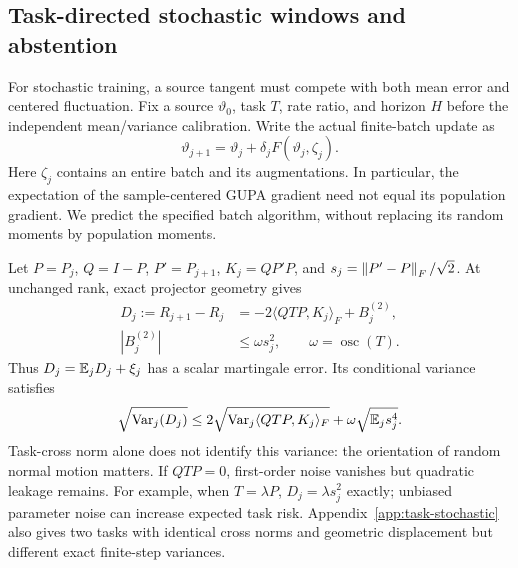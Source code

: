 \subsection{Task-directed stochastic windows and abstention}
\label{sec:task-stochastic}
For stochastic training, a source tangent must compete with both mean error and centered fluctuation. Fix a source $\vartheta_0$, task $T$, rate ratio, and horizon $H$ before the independent mean/variance calibration. Write the actual finite-batch update as
\begin{equation}
 \vartheta_{j+1}=\vartheta_j+\delta_jF(\vartheta_j,\zeta_j).
 \label{eq:stoch-update}
\end{equation}
Here $\zeta_j$ contains an entire batch and its augmentations. In particular, the expectation of the sample-centered GUPA gradient need not equal its population gradient. We predict the specified batch algorithm, without replacing its random moments by population moments.

Let $P=P_j$, $Q=I-P$, $P'=P_{j+1}$, $K_j=QP'P$, and $s_j=\left\lVert P'-P\right\rVert_F/\sqrt2$. At unchanged rank, exact projector geometry gives
\begin{align}
 D_j:=R_{j+1}-R_j&=-2\langle QTP,K_j\rangle_F+B_j^{(2)},\\
 |B_j^{(2)}|&\le\omega s_j^2,\qquad \omega=\operatorname{osc}(T).
 \label{eq:stoch-cross-leakage}
\end{align}
Thus $D_j=\mathbb E_jD_j+\xi_j$ has a scalar martingale error. Its conditional variance satisfies
\begin{equation}
 \sqrt{\operatorname{Var}_j(D_j)}
 \le2\sqrt{\operatorname{Var}_j\langle QTP,K_j\rangle_F}
       +\omega\sqrt{\mathbb E_js_j^4}.
 \label{eq:stoch-task-variance}
\end{equation}
Task-cross norm alone does not identify this variance: the orientation of random normal motion matters. If $QTP=0$, first-order noise vanishes but quadratic leakage remains. For example, when $T=\lambda P$, $D_j=\lambda s_j^2$ exactly; unbiased parameter noise can increase expected task risk. Appendix~\ref{app:task-stochastic} also gives two tasks with identical cross norms and geometric displacement but different exact finite-step variances.

